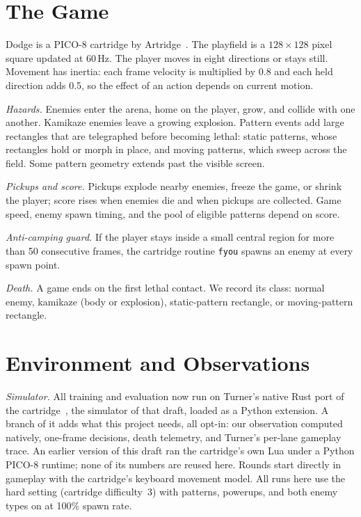 \documentclass[journal]{IEEEtran}
\begin{document}
\section{The Game}
Dodge is a PICO-8 cartridge by Artridge~\cite{artridge}. The playfield is a
$128\times128$ pixel square updated at 60\,Hz. The player moves in eight
directions or stays still. Movement has inertia: each frame velocity is
multiplied by 0.8 and each held direction adds 0.5, so the effect of an
action depends on current motion.

\emph{Hazards.} Enemies enter the arena, home on the player, grow, and collide
with one another. Kamikaze enemies leave a growing explosion. Pattern events
add large rectangles that are telegraphed before becoming lethal: static
patterns, whose rectangles hold or morph in place, and moving patterns, which
sweep across the field. Some pattern geometry extends past the visible screen.

\emph{Pickups and score.} Pickups explode nearby enemies, freeze the game, or
shrink the player; score rises when enemies die and when pickups are
collected. Game speed, enemy spawn timing, and the pool of eligible patterns
depend on score.

\emph{Anti-camping guard.} If the player stays inside a small central
region for more than 50 consecutive frames, the cartridge
routine \texttt{fyou} spawns an enemy at every spawn point.

\emph{Death.} A game ends on the first lethal contact. We record its class:
normal enemy, kamikaze (body or explosion), static-pattern rectangle, or
moving-pattern rectangle.

\section{Environment and Observations}
\emph{Simulator.} All training and evaluation now run on Turner's native
Rust port of the cartridge~\cite{turner}, the simulator of that draft, loaded
as a Python extension. A branch of it adds what this project needs, all
opt-in: our observation computed natively, one-frame decisions, death
telemetry, and Turner's per-lane gameplay trace. An earlier version of this
draft ran the cartridge's own Lua under a Python PICO-8 runtime; none of its
numbers are reused here. Rounds start directly in gameplay with the
cartridge's keyboard movement model. All runs here use the hard setting
(cartridge difficulty~3) with patterns, powerups, and both enemy types on at
100\% spawn rate.
\end{document}
